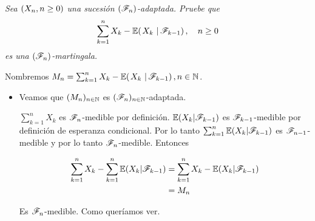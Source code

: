\emph{
    Sea $\left( X_n,n\geq 0\right) $ una sucesi\'on $\left( \mathscr{F}_n\right) $-adaptada. Pruebe que
    \begin{align}
        \sum_{k=1}^n X_k-\espc{X_k}{\F_{k-1}}, \quad n\geq 0
    \end{align}
    es una $\left( \mathscr{F}_n\right) $-martingala.
}

\afterstatement\par\null

Nombremos $M_n = \sum_{k=1}^n X_k-\espc{X_k}{\F_{k-1}}, n \in \N$.

\begin{itemize}
	\item 
        Veamos que $(M_n)_{n \in \mathbb{N}}$ es $(\mathscr{F}_n)_{n \in \mathbb{N}}$-adaptada.\par\null
    
        $\sum_{k = 1}^n X_k$ es $\mathscr{F}_n$-medible por definición. $\mathbb{E}(X_k | \mathscr{F}_{k-1})$ es $\mathscr{F}_{k-1}$-medible por definición
        de esperanza condicional. Por lo tanto $\sum_{k = 1}^n \mathbb{E}(X_k | \mathscr{F}_{k-1})$ es $\mathscr{F}_{n-1}$-medible y por lo tanto
        $\mathscr{F}_n$-medible. Entonces
        
        \begin{align}
            \sum_{k = 1}^n X_k - \sum_{k = 1}^n \mathbb{E}(X_k | \mathscr{F}_{k-1}) &=  \sum_{k = 1}^n X_k - \mathbb{E}(X_k | \mathscr{F}_{k-1})    \\
                                                                    &=  M_n   
        \end{align}
    
        Es $\mathscr{F}_n$-medible. Como queríamos ver.
\end{itemize}